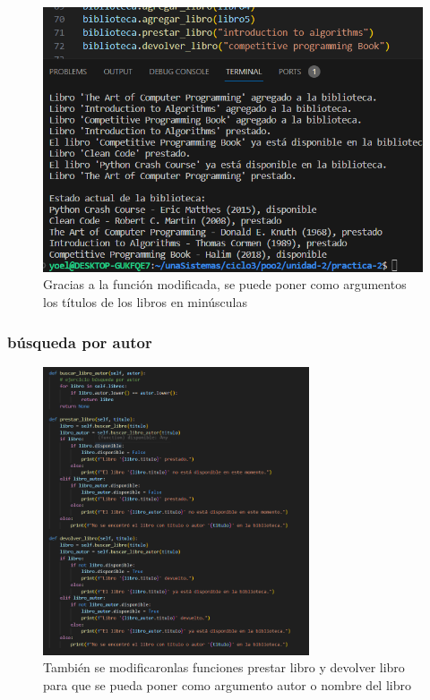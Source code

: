 \documentclass[11pt,a4paper]{article}
\begin{document}
\begin{figure}[H]
    \centering
    \includegraphics{images/3-ej2-2.png}
    \caption{Gracias a la función modificada, se puede poner como argumentos los títulos de los libros en minúsculas}
    \label{fig:enter-label}
\end{figure}
\subsubsection{búsqueda por autor}
\begin{figure}[H]
    \centering
    \includegraphics[width=0.7\textwidth] {images/3-eje2-3.png}
    \caption{También se modificaronlas funciones prestar libro y devolver libro para que se pueda poner como argumento autor o nombre del libro}
    \label{fig:enter-label}
\end{figure}
\end{document}
